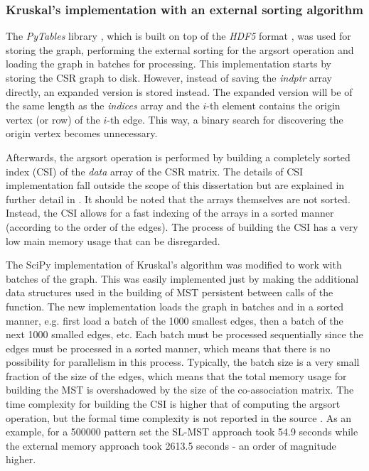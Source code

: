 \subsubsection{Kruskal's implementation with an external sorting algorithm}

The \emph{PyTables} library \cite{pytables}, which is built on top of the \emph{HDF5} format \cite{hdf5}, was used for storing the graph, performing the external sorting for the argsort operation and loading the graph in batches for processing.
This implementation starts by storing the CSR graph to disk.
However, instead of saving the \emph{indptr} array directly, an expanded version is stored instead.
The expanded version will be of the same length as the \emph{indices} array and the $i$-th element contains the origin vertex (or row) of the $i$-th edge.
This way, a binary search for discovering the origin vertex becomes unnecessary.

Afterwards, the argsort operation is performed by building a completely sorted index (CSI) of the \emph{data} array of the CSR matrix.
The details of CSI implementation fall outside the scope of this dissertation but are explained in further detail in \cite{AltetiAbad2007}.
It should be noted that the arrays themselves are not sorted.
Instead, the CSI allows for a fast indexing of the arrays in a sorted manner (according to the order of the edges).
The process of building the CSI has a very low main memory usage that can be disregarded.

The SciPy implementation of Kruskal's algorithm was modified to work with batches of the graph.
This was easily implemented just by making the additional data structures used in the building of MST persistent between calls of the function.
The new implementation loads the graph in batches and in a sorted manner, e.g. first load a batch of the 1000 smallest edges, then a batch of the next 1000 smalled edges, etc.
Each batch must be processed sequentially since the edges must be processed in a sorted manner, which means that there is no possibility for parallelism in this process.
Typically, the batch size is a very small fraction of the size of the edges, which means that the total memory usage for building the MST is overshadowed by the size of the co-association matrix.
The time complexity for building the CSI is higher that of computing the argsort operation, but the formal time complexity is not reported in the source \cite{AltetiAbad2007}.
As an example, for a 500000 pattern set the SL-MST approach took 54.9 seconds while the external memory approach took 2613.5 seconds - an order of magnitude higher.

